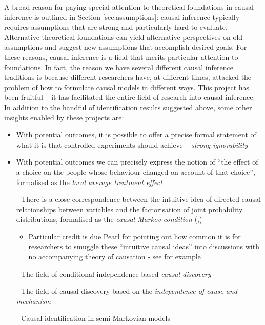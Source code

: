 A broad reason for paying special attention to theoretical foundations in causal inference is outlined in Section \ref{sec:assumptions}: causal inference typically requires assumptions that are strong and particularly hard to evaluate. Alternative theoretical foundations can yield alternative perspectives on old assumptions and suggest new assumptions that accomplish desired goals. For these reasons, causal inference is a field that merits particular attention to foundations. In fact, the reason we have several different causal inference traditions is because different researchers have, at different times, attacked the problem of how to formulate causal models in different ways. This project has been fruitful -- it has facilitated the entire field of research into causal inference. In addition to the handful of identification results suggested above, some other insights enabled by these projects are:
\begin{itemize}
    \item With potential outcomes, it is possible to offer a precise formal statement of what it is that controlled experiments should achieve -- \emph{strong ignorability} \citep{rubin_causal_2005}
    \item With potential outcomes we can precisely express the notion of ``the effect of a choice on the people whose behaviour changed on account of that choice'', formalised as the \emph{local average treatment effect} \citep{imbens_identification_1994}
    \item[-] There is a close correspondence between the intuitive idea of directed causal relationships between variables and the factorisation of joint probability distributions, formalised as the \emph{causal Markov condition} (\citet[Chap. ~1]{pearl_causality:_2009},\citet{wright_method_1934})
    \begin{itemize}
        \item Particular credit is due Pearl for pointing out how common it is for researchers to smuggle these ``intuitive causal ideas'' into discussions with no accompanying theory of causation - see for example \citet[pg. 96]{pearl_causality:_2009}
    \end{itemize}
    \item[-] The field of conditional-independence based \emph{causal discovery} \citet{spirtes_causation_1993}
    \item[-] The field of causal discovery based on the \emph{independence of cause and mechanism} \citet{scholkopf_causality_2022}
    \item[-] Causal identification in semi-Markovian models \citet{shpitser_complete_2008}
\end{itemize}

